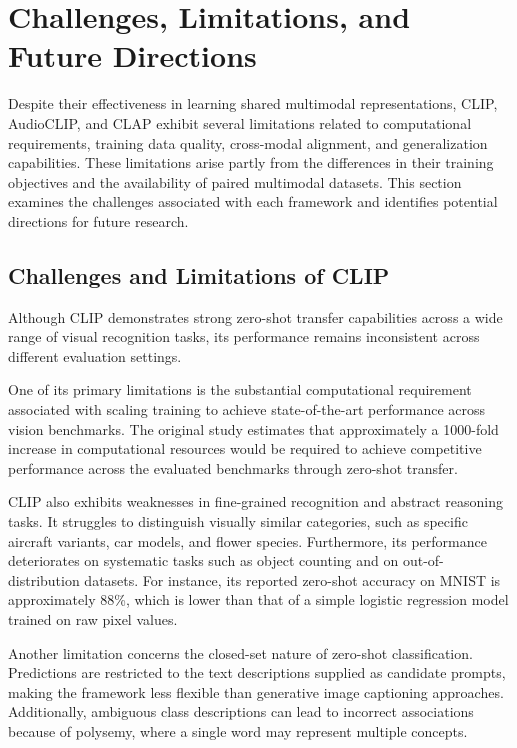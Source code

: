 \documentclass[pdflatex,sn-mathphys-num]{sn-jnl}%
\theoremstyle{thmstyleone}%
\theoremstyle{thmstyletwo}%
\theoremstyle{thmstylethree}%
\begin{document}
\section{Challenges, Limitations, and Future Directions}\label{sec6}

Despite their effectiveness in learning shared multimodal representations, CLIP, AudioCLIP, and CLAP exhibit several limitations related to computational requirements, training data quality, cross-modal alignment, and generalization capabilities. These limitations arise partly from the differences in their training objectives and the availability of paired multimodal datasets. This section examines the challenges associated with each framework and identifies potential directions for future research.

\subsection{Challenges and Limitations of CLIP}

Although CLIP demonstrates strong zero-shot transfer capabilities across a wide range of visual recognition tasks, its performance remains inconsistent across different evaluation settings.

One of its primary limitations is the substantial computational requirement associated with scaling training to achieve state-of-the-art performance across vision benchmarks. The original study estimates that approximately a 1000-fold increase in computational resources would be required to achieve competitive performance across the evaluated benchmarks through zero-shot transfer.

CLIP also exhibits weaknesses in fine-grained recognition and abstract reasoning tasks. It struggles to distinguish visually similar categories, such as specific aircraft variants, car models, and flower species. Furthermore, its performance deteriorates on systematic tasks such as object counting and on out-of-distribution datasets. For instance, its reported zero-shot accuracy on MNIST is approximately 88\%, which is lower than that of a simple logistic regression model trained on raw pixel values.

Another limitation concerns the closed-set nature of zero-shot classification. Predictions are restricted to the text descriptions supplied as candidate prompts, making the framework less flexible than generative image captioning approaches. Additionally, ambiguous class descriptions can lead to incorrect associations because of polysemy, where a single word may represent multiple concepts.
\end{document}
